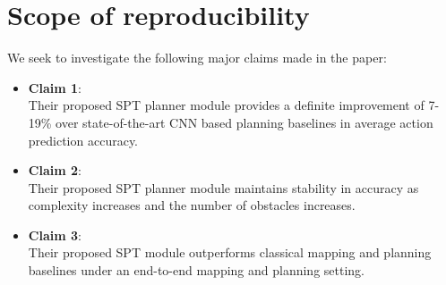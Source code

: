 \section{Scope of reproducibility}
\label{sec:claims}



We seek to investigate the following major claims made in the paper:
\begin{itemize}
    \item \textbf{Claim 1}:\\
    Their proposed SPT planner module provides a definite improvement of 7-19\% over state-of-the-art CNN based planning baselines in average action prediction accuracy.
    \item \textbf{Claim 2}:\\
    Their proposed SPT planner module maintains stability in accuracy as complexity increases and the number of obstacles increases.
    \item \textbf{Claim 3}:\\
    Their proposed SPT module outperforms classical mapping and planning baselines under an end-to-end mapping and planning setting.
\end{itemize}

